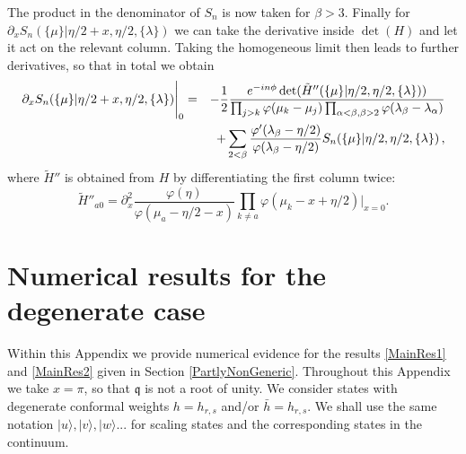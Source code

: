 \documentclass[a4paper,10pt]{article}
\newcommand{\q}{\mathfrak{q}}
\newcommand{\linnea}[1]{$\framebox{\tiny L}$\ \textbf{\texttt{{\color{red}\footnotesize#1}}}}
\begin{document}
The product in the denominator of $S_n$ is now taken for $\beta>3$. Finally for $\partial_x S_n(\{\mu\}|\eta/2+x,\eta/2,\{\lambda\})$ we can take the derivative inside $\det(H)$ and let it act on the relevant column. Taking the homogeneous limit then leads to further derivatives, so that in total we obtain
\begin{eqnarray}
\partial_x S_n(\{\mu\}|\eta/2+x,\eta/2,\{\lambda\})\Bigg|_0 &=&
-\frac{1}{2} \frac{{\color{black} e^{-in\phi}}\det(\tilde{H}''(\{\mu\}|\eta/2,\eta/2,\{\lambda\}))}{\prod_{j>k} \varphi(\mu_k-\mu_j) \prod_{\alpha<\beta,\beta>2}\varphi(\lambda_\beta - \lambda_\alpha) } \nonumber \\
%
& & + \sum_{2<\beta} \frac{ \varphi'(\lambda_\beta-\eta/2)}{ \varphi(\lambda_\beta - \eta/2 ) } S_n(\{\mu\}|\eta/2,\eta/2,\{\lambda\}) \,,
\end{eqnarray}
where $\tilde{H}''$ is obtained from $H$  by differentiating the first column twice:
\begin{equation}
\tilde{H}''_{a0}=\partial^2_x \frac{\varphi(\eta)}{\varphi(\mu_a-\eta/2-x)} \prod_{k\neq a} \varphi(\mu_k-x+\eta/2)\Bigg|_{x=0}.
\end{equation}





\section{Numerical results for the degenerate case}\label{NumericsAppendix}

Within this Appendix we provide numerical evidence for the results \eqref{MainRes1} and \eqref{MainRes2} given in Section \ref{PartlyNonGeneric}. Throughout this Appendix we take $x=\pi$, so that $\q$ is not a root of unity. We consider states with degenerate conformal weights $h=h_{r,s}$ and/or $\bar{h}=h_{r,s}$. We shall use the same notation $|u\rangle,|v\rangle,|w\rangle...$ for scaling states and the corresponding states in the continuum. 
\end{document}
